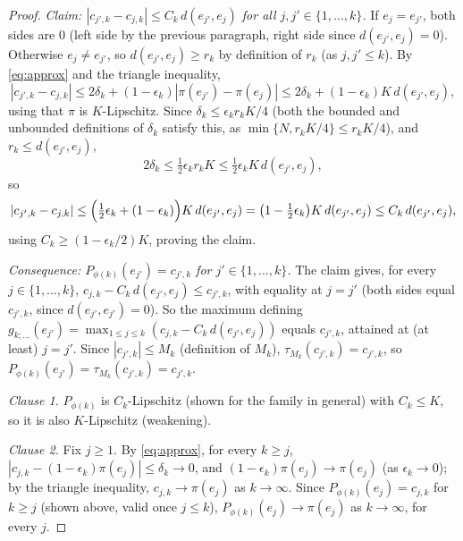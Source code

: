 \begin{proof}
  \emph{Claim: $|c_{j',k}-c_{j,k}| \le C_k\,d(e_{j'},e_j)$ for all $j,j' \in \{1,\dots,k\}$.} If
  $e_j = e_{j'}$, both sides are $0$ (left side by the previous paragraph, right side since
  $d(e_{j'},e_j)=0$). Otherwise $e_j \ne e_{j'}$, so $d(e_{j'},e_j) \ge r_k$ by definition of $r_k$
  (as $j,j' \le k$). By \eqref{eq:approx} and the triangle inequality,
  \[
    |c_{j',k}-c_{j,k}| \le 2\delta_k + (1-\epsilon_k)|\pi(e_{j'})-\pi(e_j)|
      \le 2\delta_k + (1-\epsilon_k)K\,d(e_{j'},e_j)
    ,
  \]
  using that $\pi$ is $K$-Lipschitz. Since $\delta_k \le \epsilon_k r_k K/4$ (both the bounded and
  unbounded definitions of $\delta_k$ satisfy this, as $\min\{N,r_kK/4\}\le r_kK/4$), and $r_k \le
  d(e_{j'},e_j)$,
  \[
    2\delta_k \le \tfrac{1}{2}\epsilon_k r_k K \le \tfrac12 \epsilon_k K\,d(e_{j'},e_j)
    ,
  \]
  so
  \[
    |c_{j',k}-c_{j,k}| \le \Bigl(\tfrac12\epsilon_k + (1-\epsilon_k)\Bigr)K\,d(e_{j'},e_j)
      = \bigl(1-\tfrac12\epsilon_k\bigr)K\,d(e_{j'},e_j) \le C_k\,d(e_{j'},e_j)
    ,
  \]
  using $C_k \ge (1-\epsilon_k/2)K$, proving the claim.

  \emph{Consequence: $P_{\phi(k)}(e_{j'}) = c_{j',k}$ for $j' \in \{1,\dots,k\}$.} The claim gives,
  for every $j \in \{1,\dots,k\}$, $c_{j,k} - C_k\,d(e_{j'},e_j) \le c_{j',k}$, with equality at
  $j=j'$ (both sides equal $c_{j',k}$, since $d(e_{j'},e_{j'})=0$). So the maximum defining
  $g_{k;\dots}(e_{j'}) = \max_{1\le j\le k}(c_{j,k}-C_k\,d(e_{j'},e_j))$ equals $c_{j',k}$, attained
  at (at least) $j=j'$. Since $|c_{j',k}| \le M_k$ (definition of $M_k$), $\tau_{M_k}(c_{j',k}) =
  c_{j',k}$, so $P_{\phi(k)}(e_{j'}) = \tau_{M_k}(c_{j',k}) = c_{j',k}$.

  \emph{Clause 1.} $P_{\phi(k)}$ is $C_k$-Lipschitz (shown for the family in general) with $C_k \le
  K$, so it is also $K$-Lipschitz (weakening).

  \emph{Clause 2.} Fix $j \ge 1$. By \eqref{eq:approx}, for every $k \ge j$, $|c_{j,k} -
  (1-\epsilon_k)\pi(e_j)| \le \delta_k \to 0$, and $(1-\epsilon_k)\pi(e_j) \to \pi(e_j)$ (as
  $\epsilon_k \to 0$); by the triangle inequality, $c_{j,k} \to \pi(e_j)$ as $k \to \infty$. Since
  $P_{\phi(k)}(e_j) = c_{j,k}$ for $k \ge j$ (shown above, valid once $j \le k$), $P_{\phi(k)}(e_j)
  \to \pi(e_j)$ as $k \to \infty$, for every $j$.


\end{proof}
